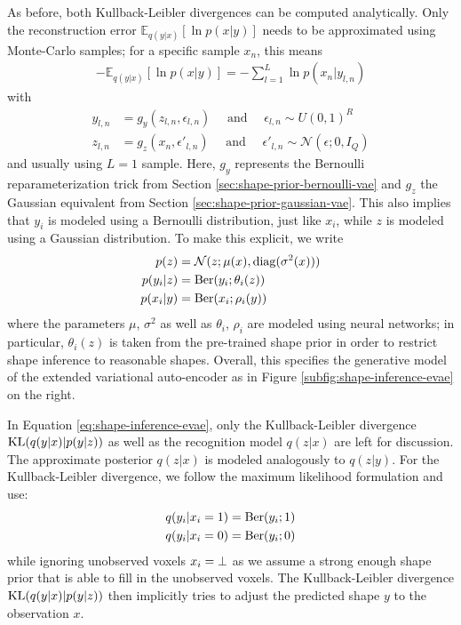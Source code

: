 As before, both Kullback-Leibler divergences can be computed analytically. Only
the reconstruction error $\mathbb{E}_{q(y|x)}[\ln p(x|y)]$ needs to be 
approximated using Monte-Carlo samples; for a specific sample $x_n$, this means
\begin{align}
  - \mathbb{E}_{q(y | x)}[\ln p(x | y)] = - \sum_{l = 1}^L \ln p(x_n | y_{l,n})
\end{align}
with
\begin{align}
  y_{l,n} &= g_y(z_{l,n}, \epsilon_{l,n})\quad\text{ and }\quad\epsilon_{l,n} \sim U(0,1)^R\\
  z_{l,n} &= g_z(x_n, \epsilon'_{l,n})\quad\text{ and }\quad\epsilon'_{l,n} \sim \mathcal{N}(\epsilon;0,I_Q)
\end{align}
and usually using $L = 1$ sample. Here, $g_y$ represents the Bernoulli
reparameterization trick from
Section \ref{sec:shape-prior-bernoulli-vae} and $g_z$ the Gaussian equivalent
from Section \ref{sec:shape-prior-gaussian-vae}. This also implies that
$y_i$ is modeled using a Bernoulli distribution, just like $x_i$, while
$z$ is modeled using a Gaussian distribution. To make this explicit,
we write
\begin{align}
  p(z) &= \mathcal{N}(z;\mu(x), \mathrm{diag}(\sigma^2(x)))\\
  p(y_i | z) &= \mathrm{Ber}(y_i;\theta_i(z))\\
  p(x_i | y) &= \mathrm{Ber}(x_i;\rho_i(y))
\end{align}
where the parameters $\mu$, $\sigma^2$ as well as $\theta_i$, $\rho_i$
are modeled using neural networks; in particular, $\theta_i(z)$ is taken
from the pre-trained shape prior in order to restrict shape inference to
reasonable shapes. Overall,
this specifies the generative model of the extended variational auto-encoder
as in Figure \ref{subfig:shape-inference-evae} on the right.

In Equation \eqref{eq:shape-inference-evae}, only the Kullback-Leibler divergence
$\mathrm{KL}(q(y|x)|p(y|z))$ as well as the recognition model $q(z|x)$ are left
for discussion. The approximate posterior $q(z|x)$ is modeled analogously
to $q(z|y)$. For the Kullback-Leibler divergence, we follow the
maximum likelihood formulation and use:
\begin{align}
  q(y_i | x_i = 1) &= \mathrm{Ber}(y_i; 1)\\
  q(y_i | x_i = 0) &= \mathrm{Ber}(y_i; 0)
\end{align}
while ignoring unobserved voxels $x_i = \bot$ as we assume a strong enough 
shape prior that is able to fill in the unobserved voxels.
The Kullback-Leibler divergence $\mathrm{KL}(q(y|x)|p(y|z))$ then implicitly tries to
adjust the predicted shape $y$ to the observation $x$.

